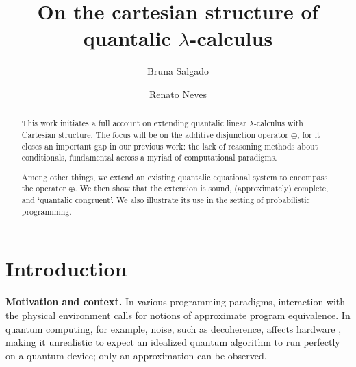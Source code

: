 \documentclass[a4paper,UKenglish,cleveref, autoref, thm-restate]{lipics-v2021}
\title{On the cartesian structure of quantalic $\lambda$-calculus} %
\author{Bruna Salgado}{University of Minho and INESC-TEC, Portugal }{johnqpublic@dummyuni.org}{https://orcid.org/0000-0002-1825-0097}{}%
\author{Renato Neves}{University of Minho and INESC-TEC, Portugal}{nevrenato@di.uminho.pt}{https://orcid.org/0000-0002-8787-2551}{}
\begin{document}
\maketitle

\begin{abstract}

This work initiates a full account on extending quantalic linear
$\lambda$-calculus with Cartesian structure. The focus will be on the additive
disjunction operator $\oplus$, for it closes an important gap in our previous
work: the lack of reasoning methods about conditionals, fundamental
across a myriad of computational paradigms. 

Among other things, we extend an existing quantalic equational system to
encompass the operator $\oplus$. We then show that the extension is sound, (approximately)
complete, and `quantalic congruent'. We also illustrate its use in the setting
of probabilistic programming.

\end{abstract}

\section{Introduction}
\label{sec:intro}


\noindent
\textbf{Motivation and context.}
In various programming paradigms, interaction with the physical environment
calls for notions of approximate program equivalence.  In quantum computing,
for example, noise, such as decoherence, affects hardware
\cite{watrous2018theory,nielsen2010quantum,preskill2018quantum}, making it
unrealistic to expect an idealized quantum algorithm to run perfectly on a
quantum device; only an approximation can be observed. 
\end{document}
